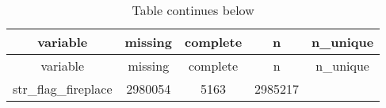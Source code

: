 \documentclass[]{book}
\theoremstyle{definition}
\theoremstyle{definition}
\theoremstyle{definition}
\theoremstyle{remark}
\begin{document}
\begin{longtable}[]{@{}ccccc@{}}
\caption{Table continues below}\tabularnewline
\toprule
\begin{minipage}[b]{0.25\columnwidth}\centering\strut
variable\strut
\end{minipage} & \begin{minipage}[b]{0.12\columnwidth}\centering\strut
missing\strut
\end{minipage} & \begin{minipage}[b]{0.13\columnwidth}\centering\strut
complete\strut
\end{minipage} & \begin{minipage}[b]{0.12\columnwidth}\centering\strut
n\strut
\end{minipage} & \begin{minipage}[b]{0.12\columnwidth}\centering\strut
n\_unique\strut
\end{minipage}\tabularnewline
\midrule
\endfirsthead
\toprule
\begin{minipage}[b]{0.25\columnwidth}\centering\strut
variable\strut
\end{minipage} & \begin{minipage}[b]{0.12\columnwidth}\centering\strut
missing\strut
\end{minipage} & \begin{minipage}[b]{0.13\columnwidth}\centering\strut
complete\strut
\end{minipage} & \begin{minipage}[b]{0.12\columnwidth}\centering\strut
n\strut
\end{minipage} & \begin{minipage}[b]{0.12\columnwidth}\centering\strut
n\_unique\strut
\end{minipage}\tabularnewline
\midrule
\endhead
\begin{minipage}[t]{0.25\columnwidth}\centering\strut
str\_flag\_fireplace\strut
\end{minipage} & \begin{minipage}[t]{0.12\columnwidth}\centering\strut
2980054\strut
\end{minipage} & \begin{minipage}[t]{0.13\columnwidth}\centering\strut
5163\strut
\end{minipage} & \begin{minipage}[t]{0.12\columnwidth}\centering\strut
2985217\strut
\end{minipage} & \begin{minipage}[t]{0.12\columnwidth}\centering\strut

\end{minipage}
\end{longtable}
\end{document}
